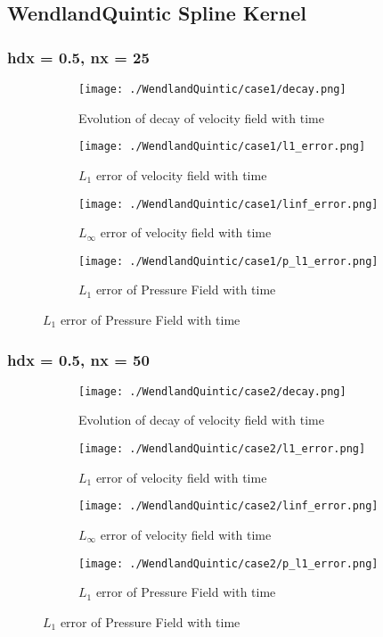 \documentclass[11pt, a4paper]{article}
\begin{document}
\subsection{WendlandQuintic Spline Kernel}
\subsubsection{hdx = 0.5, nx = 25}
\begin{figure}[H]
\begin{subfigure}{0.48\textwidth}
\texttt{[image: ./WendlandQuintic/case1/decay.png]}
\caption{Evolution of decay of velocity field with time}
\end{subfigure}
\begin{subfigure}{0.48\textwidth}
\texttt{[image: ./WendlandQuintic/case1/l1\_error.png]}
\caption{$L_1$ error of velocity field with time}
\end{subfigure}
\medskip
\begin{subfigure}{0.48\textwidth}
\texttt{[image: ./WendlandQuintic/case1/linf\_error.png]}
\caption{$L_\infty$ error of velocity field with time}
\end{subfigure}
\begin{subfigure}{0.48\textwidth}
\texttt{[image: ./WendlandQuintic/case1/p\_l1\_error.png]}
\caption{$L_1$ error of Pressure Field with time}
\end{subfigure}
\end{figure}

\subsubsection{hdx = 0.5, nx = 50}
\begin{figure}[H]
\begin{subfigure}{0.48\textwidth}
\texttt{[image: ./WendlandQuintic/case2/decay.png]}
\caption{Evolution of decay of velocity field with time}
\end{subfigure}
\begin{subfigure}{0.48\textwidth}
\texttt{[image: ./WendlandQuintic/case2/l1\_error.png]}
\caption{$L_1$ error of velocity field with time}
\end{subfigure}
\medskip
\begin{subfigure}{0.48\textwidth}
\texttt{[image: ./WendlandQuintic/case2/linf\_error.png]}
\caption{$L_\infty$ error of velocity field with time}
\end{subfigure}
\begin{subfigure}{0.48\textwidth}
\texttt{[image: ./WendlandQuintic/case2/p\_l1\_error.png]}
\caption{$L_1$ error of Pressure Field with time}
\end{subfigure}
\end{figure}
\end{document}
